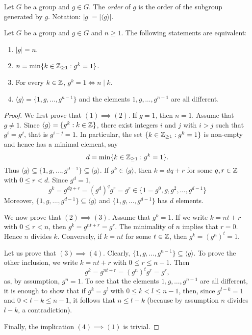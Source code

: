 \begin{definition}
        Let $G$ be a group and $g\in G$. The \emph{order} of $g$
        is the order of the subgroup generated by $g$. Notation:
        $|g|=|\langle g\rangle|$.
\end{definition}


\begin{theorem}
        Let $G$ be a group and $g\in G$ and $n\geq1$. 
        The following statements are equivalent:
        \begin{enumerate}
                \item $|g|=n$.
                \item $n=\min\{k\in\mathbb{Z}_{\geq1}:g^k=1\}$.
                \item For every $k\in\mathbb{Z}$, $g^k=1\Longleftrightarrow n\mid k$.
                \item $\langle g\rangle=\{1,g,\dots,g^{n-1}\}$ and 
                the elements $1,g,\dots,g^{n-1}$ are all different.
        \end{enumerate}
\end{theorem}


\begin{proof}
        We first prove that $(1)\implies(2)$.
        If $g=1$, then $n=1$. Assume that $g\ne1$. Since $\langle g\rangle=\{g^k:k\in\mathbb{Z}\}$,
        there exist integers $i$ and $j$ with $i>j$ such that $g^i=g^j$, that is $g^{i-j}=1$. In particular,
        the set $\{k\in\mathbb{Z}_{\geq1}:g^k=1\}$ is non-empty and hence has a minimal element, say 
        \[
        d=\min\{k\in\mathbb{Z}_{\geq1}:g^k=1\}.
        \]
        Thus $\langle g\rangle\subseteq\{1,g,\dots,g^{d-1}\}\subseteq\langle g\rangle$. 
        If $g^k\in\langle g\rangle$, then $k=dq+r$ for some $q,r\in\mathbb{Z}$ with $0\leq r<d$. Since $g^d=1$,
        \[
        g^k=g^{dq+r}=(g^d)^qg^r=g^r\in\{1=g^0,g,g^2,\dots,g^{d-1}\}
        \]
        Moreover, $\{1,g,\dots,g^{d-1}\}\subseteq \langle g\rangle$ and 
        $\{1,g,\dots,g^{d-1}\}$ has $d$ elements.

        We now prove that $(2)\implies(3)$. Assume that $g^k=1$. If 
        we write $k=nt+r$ with $0\leq r<n$, then $g^k=g^{nt+r}=g^r$. The minimality of $n$ 
        implies that $r=0$. Hence $n$ divides $k$.
        Conversely, if $k=nt$ for some $t\in\mathbb{Z}$, then $g^k=(g^n)^t=1$.

        Let us prove that $(3)\implies(4)$. Clearly, 
        $\{1,g,\dots,g^{n-1}\}\subseteq\langle g\rangle$. To prove the other 
        inclusion, we write $k=nt+r$ with $0\leq r\leq n-1$. Then 
        \[
                g^k=g^{nt+r}=(g^n)^tg^r=g^r, 
        \]
        as, by assumption, $g^n=1$. To see that the elements 
        $1,g,\dots,g^{n-1}$ are all different, it is enough to show that if $g^k=g^l$ with $0\leq
        k<l\leq n-1$, then, since $g^{l-k}=1$ and $0<l-k\leq n-1$, it follows that 
        $n\leq l-k$ (because by assumption $n$ divides $l-k$, a contradiction).

        Finally, the implication $(4)\implies(1)$ is trivial.
\end{proof}

